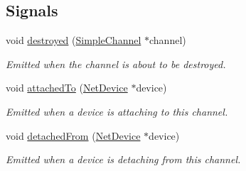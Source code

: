\subsection*{Signals}
\begin{DoxyCompactItemize}
\item 
void \hyperlink{classSimpleChannel_a98ab252a64e2a4c14995e443f522ab7f}{destroyed} (\hyperlink{classSimpleChannel}{Simple\+Channel} $\ast$channel)
\begin{DoxyCompactList}\small\item\em Emitted when the channel is about to be destroyed. \end{DoxyCompactList}\item 
void \hyperlink{classSimpleChannel_a3ad9f5e7f28555474627eb42c6427bbe}{attached\+To} (\hyperlink{classNetDevice}{Net\+Device} $\ast$device)
\begin{DoxyCompactList}\small\item\em Emitted when a device is attaching to this channel. \end{DoxyCompactList}\item 
void \hyperlink{classSimpleChannel_a97a24487241781870c5aea86530a982c}{detached\+From} (\hyperlink{classNetDevice}{Net\+Device} $\ast$device)
\begin{DoxyCompactList}\small\item\em Emitted when a device is detaching from this channel. \end{DoxyCompactList}\end{DoxyCompactItemize}
